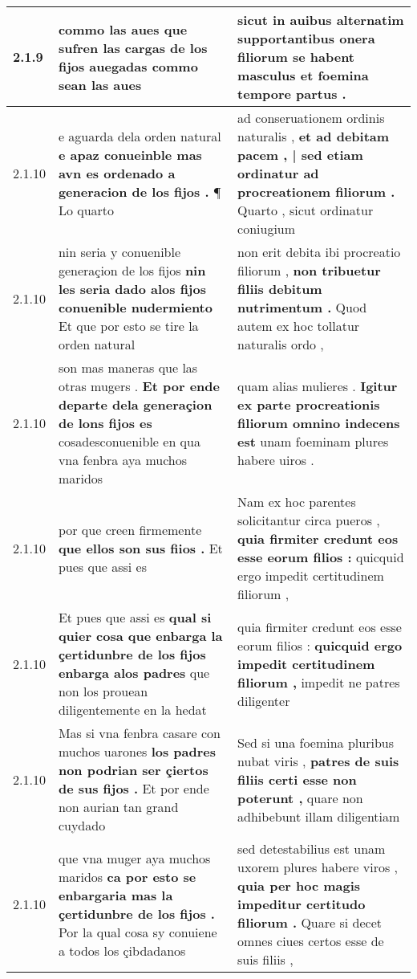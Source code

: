 \begin{tabular}{|p{1cm}|p{6.5cm}|p{6.5cm}|}
2.1.9 & commo las aues \textbf{ que sufren las cargas de los fijos auegadas } commo sean las aues & sicut in auibus alternatim supportantibus \textbf{ onera filiorum } se habent masculus et foemina tempore partus . \\\hline
2.1.10 & e aguarda dela orden natural \textbf{ e apaz conueinble mas avn es ordenado a generacion de los fijos . } ¶ Lo quarto & ad conseruationem ordinis naturalis , \textbf{ et ad debitam pacem , | sed etiam ordinatur ad procreationem filiorum . } Quarto , sicut ordinatur coniugium \\\hline
2.1.10 & nin seria y conuenible generaçion de los fijos \textbf{ nin les seria dado alos fijos conuenible nudermiento } Et que por esto se tire la orden natural & non erit debita ibi procreatio filiorum , \textbf{ non tribuetur filiis debitum nutrimentum . } Quod autem ex hoc tollatur naturalis ordo , \\\hline
2.1.10 & son mas maneras que las otras mugers . \textbf{ Et por ende departe dela generaçion de lons fijos es } cosadesconuenible en qua vna fenbra aya muchos maridos & quam alias mulieres . \textbf{ Igitur ex parte procreationis filiorum omnino indecens est } unam foeminam plures habere uiros . \\\hline
2.1.10 & por que creen firmemente \textbf{ que ellos son sus fiios . } Et pues que assi es & Nam ex hoc parentes solicitantur circa pueros , \textbf{ quia firmiter credunt eos esse eorum filios : } quicquid ergo impedit certitudinem filiorum , \\\hline
2.1.10 & Et pues que assi es \textbf{ qual si quier cosa que enbarga la çertidunbre de los fijos enbarga alos padres } que non los prouean diligentemente en la hedat & quia firmiter credunt eos esse eorum filios : \textbf{ quicquid ergo impedit certitudinem filiorum , } impedit ne patres diligenter \\\hline
2.1.10 & Mas si vna fenbra casare con muchos uarones \textbf{ los padres non podrian ser çiertos de sus fijos . } Et por ende non aurian tan grand cuydado & Sed si una foemina pluribus nubat viris , \textbf{ patres de suis filiis certi esse non poterunt , } quare non adhibebunt illam diligentiam \\\hline
2.1.10 & que vna muger aya muchos maridos \textbf{ ca por esto se enbargaria mas la çertidunbre de los fijos . } Por la qual cosa sy conuiene a todos los çibdadanos & sed detestabilius est unam uxorem plures habere viros , \textbf{ quia per hoc magis impeditur certitudo filiorum . } Quare si decet omnes ciues certos esse de suis filiis , \\\hline

\end{tabular}
